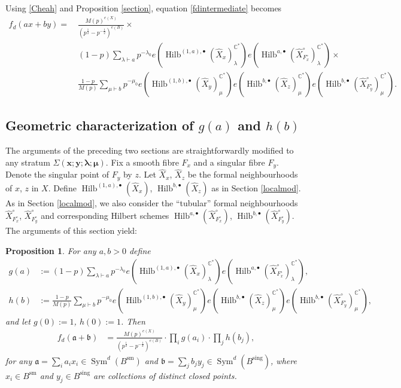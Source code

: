 \documentclass{amsart}
\newtheorem{proposition}[theorem]{Proposition}
\theoremstyle{definition}
\newcommand{\CC} {\mathbb{C}}          %
\newcommand{\Sym}{\operatorname{Sym}}
\newcommand{\Hilb}{\operatorname{Hilb}}
\newcommand{\sm}{\operatorname{sm}}
\newcommand{\sing}{\operatorname{sing}}
\begin{document}
Using \eqref{Cheah} and Proposition \ref{section}, equation \eqref{fdintermediate} becomes
\begin{align*}
f_d(ax+by) = \ &\frac{M(p)^{e(X)}}{(p^{\frac{1}{2}}-p^{-\frac{1}{2}})^{e(B)}} \times \\
&(1-p) \sum_{\lambda \vdash a} p^{-\lambda_0} e(\Hilb^{(1,a),\bullet}(\widehat{X}_x)_{\lambda}^{\CC^*}) e(\Hilb^{a,\bullet}(\widehat{X}^{\circ}_{F_{x}^{\circ}})_{\lambda}^{\CC^*}) \times \\
&\frac{1-p}{M(p)} \sum_{\mu \vdash b} p^{-\mu_0} e(\Hilb^{(1,b),\bullet}(\widehat{X}_y)_{\mu}^{\CC^*}) e(\Hilb^{b,\bullet}(\widehat{X}_z)_{\mu}^{\CC^*}) e(\Hilb^{b,\bullet}(\widehat{X}^{\circ}_{F_{y}^{\circ}})_{\mu}^{\CC^*}).
\end{align*}

   
\subsection{Geometric characterization of $g(a)$ and $h(b)$} \label{chargh}

The arguments of the preceding two sections are straightforwardly modified to any stratum $\Sigma(\boldsymbol{x};\boldsymbol{y};\boldsymbol{\lambda};\boldsymbol{\mu})$. Fix a smooth fibre $F_x$ and a singular fibre $F_y$. Denote the singular point of $F_y$ by $z$. Let $\widehat{X}_x$, $\widehat{X}_z$ be the formal neighbourhoods of $x$, $z$ in $X$. Define $\Hilb^{(1,a),\bullet}(\widehat{X}_x)$, $\Hilb^{b,\bullet}(\widehat{X}_z)$ as in Section \ref{localmod}. As in Section \ref{localmod}, we also consider the ``tubular'' formal neighbourhoods $\widehat{X}^{\circ}_{F_{x}^{\circ}}$, $\widehat{X}^{\circ}_{F_{y}^{\circ}}$ and corresponding Hilbert schemes $\Hilb^{a,\bullet}(\widehat{X}^{\circ}_{F_{x}^{\circ}})$, $\Hilb^{b,\bullet}(\widehat{X}^{\circ}_{F_{y}^{\circ}})$. The arguments of this section yield:
\begin{proposition} \label{geomgh}
For any $a,b>0$ define
\begin{align*}
g(a) &:= (1-p) \sum_{\lambda \vdash a} p^{-\lambda_0} e(\Hilb^{(1,a),\bullet}(\widehat{X}_x)_{\lambda}^{\CC^*}) e(\Hilb^{a,\bullet}(\widehat{X}^{\circ}_{F_{x}^{\circ}})_{\lambda}^{\CC^*}), \\
h(b) &:= \frac{1-p}{M(p)} \sum_{\mu \vdash b} p^{-\mu_0} e(\Hilb^{(1,b),\bullet}(\widehat{X}_y)_{\mu}^{\CC^*}) e(\Hilb^{b,\bullet}(\widehat{X}_z)_{\mu}^{\CC^*}) e(\Hilb^{b,\bullet}(\widehat{X}^{\circ}_{F_{y}^{\circ}})_{\mu}^{\CC^*}),
\end{align*}
and let $g(0) := 1$, $h(0) :=1$. Then
\begin{align*}
f_{d}(\mathfrak{a} + \mathfrak{b}) &= \frac{M(p)^{e(X)}}{(p^{\frac{1}{2}}-p^{-\frac{1}{2}})^{e(B)}} \cdot \prod_{i} g(a_i) \cdot \prod_{j} h(b_j), 
\end{align*}
for any $\mathfrak{a} = \sum_i a_i x_i \in \Sym^{d}(B^{\sm})$ and $\mathfrak{b} = \sum_j b_j y_j \in \Sym^{d}(B^{\sing})$, where $x_i \in B^{\sm}$ and $y_j \in B^{\sing}$ are collections of distinct closed points.
\end{proposition}
   
\end{document}
